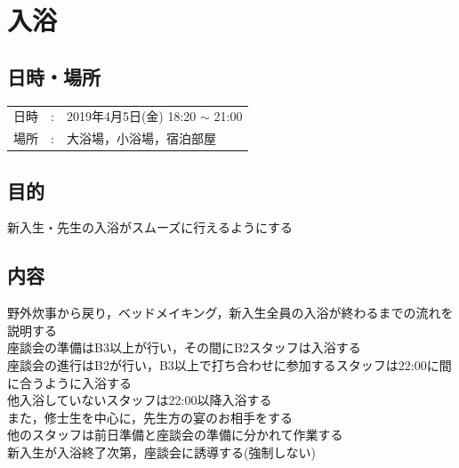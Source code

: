%
\section{入浴}


\subsection{日時・場所}
\begin{tabular}{p{}rp{}}
  日時 & : & 2019年4月5日(金) 18:20 $\sim$ 21:00\\
  場所 & : & 大浴場，小浴場，宿泊部屋
\end{tabular}


\subsection{目的}
新入生・先生の入浴がスムーズに行えるようにする

\subsection{内容}
野外炊事から戻り，ベッドメイキング，新入生全員の入浴が終わるまでの流れを説明する \\
座談会の準備はB3以上が行い，その間にB2スタッフは入浴する \\
座談会の進行はB2が行い，B3以上で打ち合わせに参加するスタッフは22:00に間に合うように入浴する \\
他入浴していないスタッフは22:00以降入浴する \\
また，修士生を中心に，先生方の宴のお相手をする \\
他のスタッフは前日準備と座談会の準備に分かれて作業する \\
新入生が入浴終了次第，座談会に誘導する(強制しない) \\

